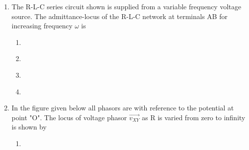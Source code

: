\documentclass[journal]{IEEEtran}
\numberwithin{equation}{enumi}
\numberwithin{figure}{enumi}
\begin{document}
\begin{enumerate}
    \item 
    The R-L-C series circuit shown is supplied from a variable frequency voltage source. The admittance-locus of the R-L-C network at terminals AB for increasing frequency $\omega$ is

    \begin{figure}[H]
        \centering
        \resizebox{0.3\textwidth}{!}{}
    \end{figure}
    \hfill{}
        \begin{multicols}{2}
        \begin{enumerate}  
        
        \item 
        \begin{figure}[H]
        \centering
        \resizebox{0.3\textwidth}{!}{}
        \end{figure}
        \item 
        \begin{figure}[H]
        \centering
        \resizebox{0.3\textwidth}{!}{}
        \end{figure}
        
        \item 
        \begin{figure}[H]
        \centering
        \resizebox{0.26\textwidth}{!}{}
        \end{figure}
        

        \item 
        \begin{figure}[H]
        \centering
        \resizebox{0.26\textwidth}{!}{}
        \end{figure}
        
        \end{enumerate}
        \end{multicols}

    \item 
    In the figure given below all phasors are with reference to the potential at point "O". The locus of voltage phasor $\vec{v_{XY}}$ as R is varied from zero to infinity is shown by 

    \begin{figure}[H]
    \centering
    \resizebox{0.4\textwidth}{!}{}
    \end{figure}
    \hfill{}
    \begin{multicols}{2}
    \begin{enumerate}
        \item  
        \begin{figure}[H]
        \centering
        \resizebox{0.4\textwidth}{!}{}
        \end{figure}


\end{enumerate}
\end{multicols}
\end{enumerate}
\end{document}
